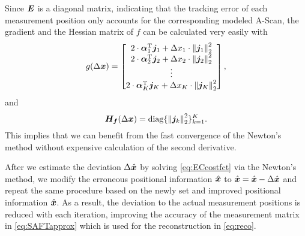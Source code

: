 %
Since $\bm{E}$ is a diagonal matrix, indicating that the tracking error of each measurement position only accounts for the corresponding  modeled A-Scan, the gradient and the Hessian matrix of $f$ can be calculated very easily with 
\begin{equation}
	g (\Delta \bm{x}) = 
	\begin{bmatrix}
		2 \cdot \bm{\alpha}_{1}^{\operatorname{T}} \bm{j}_{1} + \Delta x_{1} \cdot \left\lVert\bm{j}_{1}\right\rVert_{2}^{2}\\
		2 \cdot \bm{\alpha}_{2}^{\operatorname{T}} \bm{j}_{2} + \Delta x_{2} \cdot \left\lVert\bm{j}_{2}\right\rVert_{2}^{2}\\
		\vdots \\
		2 \cdot \bm{\alpha}_{K}^{\operatorname{T}} \bm{j}_{K} + \Delta x_{K} \cdot \left\lVert\bm{j}_{K}\right\rVert_{2}^{2}\\
	\end{bmatrix},
\end{equation}
and
\begin{equation}
	\bm{H_{f}} (\Delta \bm{x}) = \operatorname{diag} \{ \left\lVert\bm{j}_{k}\right\rVert_{2}^{2} \}_{k = 1}^{K}.
\end{equation}
This implies that we can benefit from the fast convergence of the Newton's method without expensive calculation of the second derivative. \par

After we estimate the deviation $\Delta \hat{\bm{x}}$ by solving \eqref{eq:ECcostfct} via the Newton's method, we modify the erroneous positional information $\hat{\bm{x}}$ to $\hat{\bm{x}} = \hat{\bm{x}} - \Delta \hat{\bm{x}}$ and repeat the same procedure based on the newly set and improved positional information $\hat{\bm{x}}$. As a result, the deviation to the actual measurement positions is reduced with each iteration, improving the accuracy of the measurement matrix in \eqref{eq:SAFTapprox} which is used for the reconstruction in \eqref{eq:reco}.